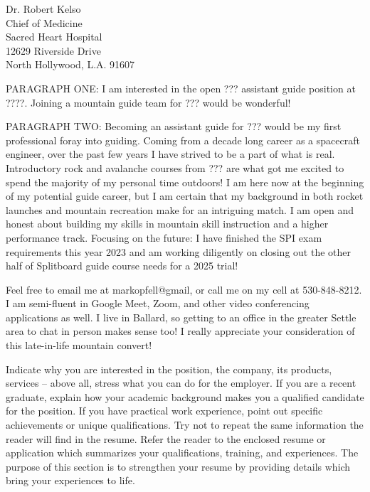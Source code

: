 \documentclass[
	parskip=half, %
	enlargefirstpage=true, %
]{scrlttr2} %
\begin{document}

\begin{letter}{
	Dr. Robert Kelso \\
	Chief of Medicine \\
	Sacred Heart Hospital \\
	12629 Riverside Drive \\
	North Hollywood, L.A. 91607
}


PARAGRAPH ONE: I am interested in the open ??? assistant guide position at ????.  Joining a mountain guide team for ??? would be wonderful!

PARAGRAPH TWO:  Becoming an assistant guide for ??? would be my first professional foray into guiding.  Coming from a decade long career as a spacecraft engineer, over the past few years I have strived to be a part of what is real.  Introductory rock and avalanche courses from ??? are what got me excited to spend the majority of my personal time outdoors! I am here now at the beginning of my potential guide career, but I am certain that my background in both rocket launches and mountain recreation make for an intriguing match.  I am open and honest about building my skills in mountain skill instruction and a higher performance track.  Focusing on the future: I have finished the SPI exam requirements this year  2023 and am working diligently on closing out the other half of Splitboard guide course needs for a 2025 trial!

Feel free to email me at markopfell@gmail, or call me on my  cell at 530-848-8212.  I am semi-fluent in Google Meet, Zoom, and other video conferencing applications as well.  I live in Ballard, so getting to an office in the greater Settle area to chat in person makes sense too!   I really appreciate your consideration of this late-in-life mountain convert!


Indicate why you are interested in the position, the company, its products, services -- above all, stress what you can do for the employer. If you are a recent graduate, explain how your academic background makes you a qualified candidate for the position. If you have practical work experience, point out specific achievements or unique qualifications. Try not to repeat the same information the reader will find in the resume. Refer the reader to the enclosed resume or application which summarizes your qualifications, training, and experiences. The purpose of this section is to strengthen your resume by providing details which bring your experiences to life.


\end{letter}
\end{document}

